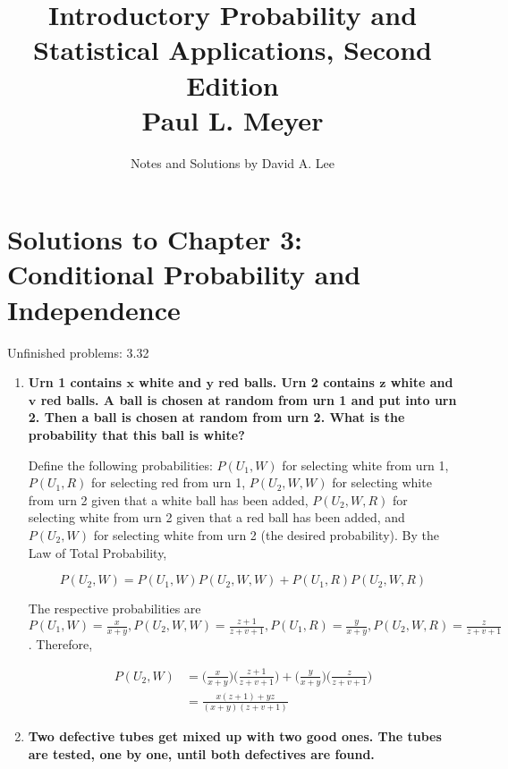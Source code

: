 \documentclass[10pt, oneside]{article}   	%
\title{Introductory Probability and Statistical Applications, Second Edition \\
\large{Paul L. Meyer}}
\author{Notes and Solutions by David A. Lee}
\date{}							%
\theoremstyle{definition}
\begin{document}
\maketitle
\section*{Solutions to Chapter 3: Conditional Probability and Independence}

Unfinished problems: 3.32

\begin{enumerate}[label=3.\arabic*]
\itemsep0em 
\item  \begin{tcolorbox}[
  colback=Cerulean!5!white,
  colframe=Cerulean!75!black]
\textbf{Urn 1 contains $\bm{x}$ white and $\bm{y}$ red balls. Urn 2 contains $\bm{z}$ white and $\bm{v}$ red balls. A ball is chosen at random from urn 1 and put into urn 2. Then a ball is chosen at random from urn 2. What is the probability that this ball is white?}
\end{tcolorbox}

Define the following probabilities: $P(U_1, W)$ for selecting white from urn 1, $P(U_1, R)$ for selecting red from urn 1, $P(U_2, W, W)$ for selecting white from urn 2 given that a white ball has been added, $P(U_2, W, R)$ for selecting white from urn 2 given that a red ball has been added, and $P(U_2, W)$ for selecting white from urn 2 (the desired probability). By the Law of Total Probability, 

\[ P(U_2, W) = P(U_1, W) P(U_2, W, W) + P(U_1, R) P(U_2, W, R) \]

The respective probabilities are $P(U_1, W) = \frac{x}{x+y},  P(U_2, W, W) = \frac{z+1}{z+v+1}, P(U_1, R) = \frac{y}{x+y}, P(U_2, W, R) = \frac{z}{z+v+1}$. Therefore,

\begin{align*}
P(U_2, W) &= \Bigg(  \frac{x}{x+y} \Bigg)  \Bigg( \frac{z+1}{z+v+1} \Bigg) + \Bigg( \frac{y}{x+y} \Bigg) \Bigg( \frac{z}{z+v+1} \Bigg) \\
&= \boxed{ \frac{x(z+1) + yz}{(x+y) (z+v+1)} }
\end{align*}

\item  \begin{tcolorbox}[
  colback=Cerulean!5!white,
  colframe=Cerulean!75!black]
\textbf{Two defective tubes get mixed up with two good ones. The tubes are tested, one by one, until both defectives are found.}
\end{tcolorbox}


\end{enumerate}
\end{document}
